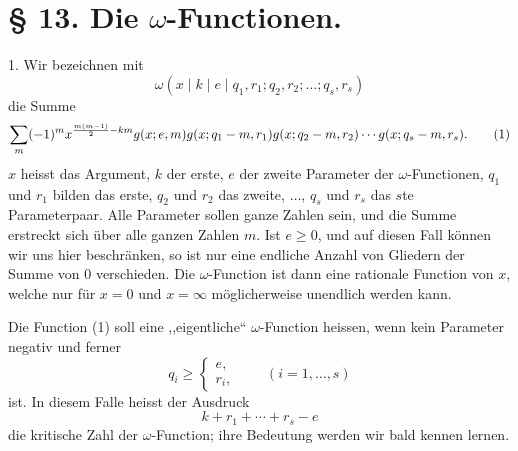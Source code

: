 \section*{§ 13. Die $\omega$-Functionen.}

1. Wir bezeichnen mit
\[
 \omega(x\mid k\mid e\mid q_1,r_1;q_2,r_2;\ldots;q_s,r_s)
\]
die Summe
\begin{equation}
 \sum_m(-1)^m x^{{m(m-1)\over2}-km}
 g(x;e,m)g(x;q_1-m,r_1)g(x;q_2-m,r_2)\cdots g(x;q_s-m,r_s).
\tag{1}
\end{equation}
$x$ heisst das Argument, $k$ der erste, $e$ der zweite Parameter der $\omega$-Functionen, $q_1$ und $r_1$ bilden das erste, $q_2$ und $r_2$ das zweite, $\ldots$, $q_s$ und $r_s$ das $s$te Parameterpaar. Alle Parameter sollen ganze Zahlen sein, und die Summe erstreckt sich über alle ganzen Zahlen $m$. Ist $e\ge0$, und auf diesen Fall können wir uns hier beschränken, so ist nur eine endliche Anzahl von Gliedern der Summe von 0 verschieden. Die $\omega$-Function ist dann eine rationale Function von $x$, welche nur für $x=0$ und $x=\infty$ möglicherweise unendlich werden kann.

Die Function (1) soll eine ,,eigentliche`` $\omega$-Function heissen, wenn kein Parameter negativ und ferner
\[
 q_i\ge \begin{cases}e,\\ r_i,
 \end{cases}\qquad(i=1,\ldots,s)
\]
ist. In diesem Falle heisst der Ausdruck
\[
 k+r_1+\cdots+r_s-e
\]
die kritische Zahl der $\omega$-Function; ihre Bedeutung werden wir bald kennen lernen.

